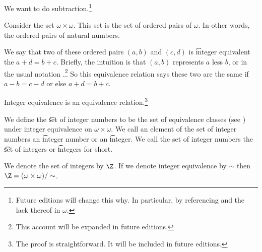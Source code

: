 

We want to do subtraction.\footnote{Future editions will change this why. In particular, by referencing  and the lack thereof in $\omega$.}


Consider the set $\omega \times \omega$.
This set is the set of ordered pairs of $\omega$.
In other words, the ordered pairs of natural numbers.

We say that two of these ordered pairs $(a, b)$ and $(c, d)$ is \t{integer equivalent} the $a + d = b +c$.
Briefly, the intuition is that $(a, b)$ represents $a$ less $b$, or in the usual notation .\footnote{This account will be expanded in future editions.}
So this equivalence relation says these two are the same if $a - b = c - d$ or else $a + d = b + c$.

\begin{proposition}
	Integer equivalence is an equivalence relation.\footnote{The proof is straightforward. It will be included in future editions.}
\end{proposition}

We define the \t{set of integer numbers} to be the set of equivalence classes (see ) under integer equivalence on $\omega \times \omega$.
We call an element of the set of integer numbers an \t{integer number} or an \t{integer}.
We call the set of integer numbers the \t{set of integers} or \t{integers} for short.


We denote the set of integers by $\Z$.
If we denote integer equivalence by $\sim$ then $\Z = (\omega \times \omega)/\sim$.

